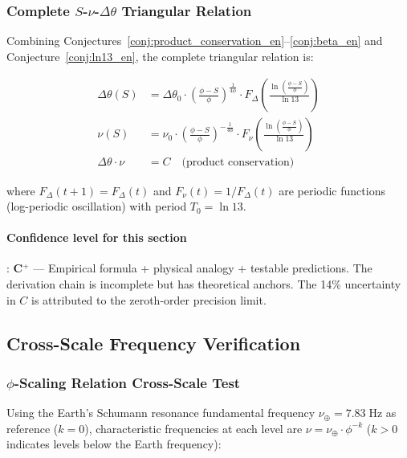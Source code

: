 \subsubsection{Complete $S$-$\nu$-$\Delta\theta$ Triangular Relation}

Combining Conjectures~\ref{conj:product_conservation_en}--\ref{conj:beta_en} and Conjecture~\ref{conj:ln13_en}, the complete triangular relation is:

\begin{equation}
\boxed{
\begin{aligned}
\Delta\theta(S) &= \Delta\theta_0 \cdot \left(\frac{\phi - S}{\phi}\right)^{\frac{1}{4\phi}} \cdot F_\Delta\!\left(\frac{\ln\!\left(\frac{\phi-S}{\phi}\right)}{\ln 13}\right) \\[6pt]
\nu(S) &= \nu_0 \cdot \left(\frac{\phi - S}{\phi}\right)^{-\frac{1}{4\phi}} \cdot F_\nu\!\left(\frac{\ln\!\left(\frac{\phi-S}{\phi}\right)}{\ln 13}\right) \\[6pt]
\Delta\theta \cdot \nu &= C \quad \text{(product conservation)}
\end{aligned}
}
\label{eq:triangle_relation_en}
\end{equation}

where $F_\Delta(t+1) = F_\Delta(t)$ and $F_\nu(t) = 1/F_\Delta(t)$ are periodic functions (log-periodic oscillation) with period $T_0 = \ln 13$.

\paragraph{Confidence level for this section}: \textbf{C$^+$} --- Empirical formula + physical analogy + testable predictions. The derivation chain is incomplete but has theoretical anchors. The 14\% uncertainty in $C$ is attributed to the zeroth-order precision limit.

\subsection{Cross-Scale Frequency Verification}
\label{subsec:cross_scale}

\subsubsection{$\phi$-Scaling Relation Cross-Scale Test}

Using the Earth's Schumann resonance fundamental frequency $\nu_{\oplus} = 7.83\;\text{Hz}$ as reference ($k=0$), characteristic frequencies at each level are $\nu = \nu_{\oplus} \cdot \phi^{-k}$ ($k>0$ indicates levels below the Earth frequency):

